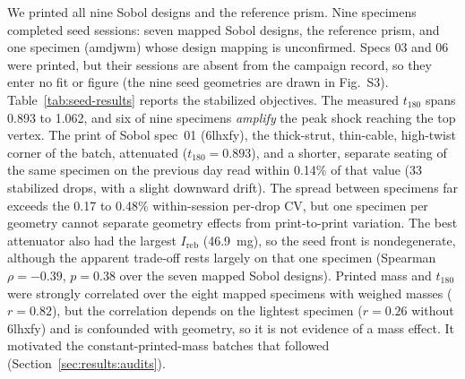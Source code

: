 \documentclass[11pt]{article}
\begin{document}
We printed all nine Sobol designs and the reference prism. Nine
specimens completed seed sessions: seven mapped Sobol designs, the
reference prism, and one specimen (amdjwm) whose design mapping is
unconfirmed. Specs 03 and 06 were printed, but their sessions are
absent from the campaign record, so they enter no fit or figure (the
nine seed geometries are drawn in Fig.~S3).
Table~\ref{tab:seed-results} reports the stabilized objectives. The
measured $t_{180}$ spans 0.893 to 1.062, and six of nine specimens
\emph{amplify} the peak shock reaching the top vertex. The print of
Sobol spec~01 (6lhxfy), the thick-strut, thin-cable, high-twist corner
of the batch, attenuated ($t_{180} = 0.893$), and a shorter, separate
seating of the same specimen on the previous day read within 0.14\% of
that value (33 stabilized drops, with a slight downward drift). The
spread between
specimens far exceeds the 0.17 to 0.48\% within-session per-drop CV,
but one specimen per geometry cannot separate geometry effects from
print-to-print variation. The best attenuator also had the largest
$I_{\mathrm{reb}}$ (\SI{46.9}{mg}), so the seed front is nondegenerate,
although the apparent trade-off rests largely on that one specimen
(Spearman $\rho = -0.39$, $p = 0.38$ over the seven mapped Sobol
designs). Printed mass and $t_{180}$ were strongly correlated over the
eight mapped specimens with weighed masses ($r = 0.82$), but the
correlation depends on the lightest specimen ($r = 0.26$ without
6lhxfy) and is confounded with geometry, so it is not evidence of a
mass effect. It motivated the constant-printed-mass batches that
followed (Section~\ref{sec:results:audits}).
\end{document}
